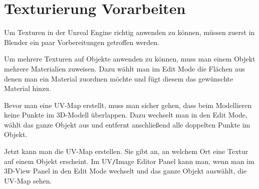\section{Texturierung Vorarbeiten}
Um Texturen in der Unreal Engine richtig anwenden zu können, müssen zuerst in Blender ein paar Vorbereitungen getroffen werden.

Um mehrere Texturen auf Objekte anwenden zu können, muss man einem Objekt mehrere Materialien zuweisen. Dazu wählt man im Edit Mode die Flächen aus denen man ein Material zuordnen
möchte und fügt diesem das gewünschte Material hinzu.

Bevor man eine UV-Map erstellt, muss man sicher gehen, dass beim Modellieren keine Punkte im 3D-Modell überlappen.
Dazu wechselt man in den Edit Mode, wählt das ganze Objekt aus und entfernt anschließend alle doppelten Punkte im Objekt.

Jetzt kann man die UV-Map erstellen. Sie gibt an, an welchem Ort eine Textur auf einem Objekt erscheint.
Im UV\verb-/-Image Editor Panel kann man, wenn man im 3D-View Panel in den Edit Mode
wechselt und das ganze Objekt auswählt, die UV-Map sehen.

